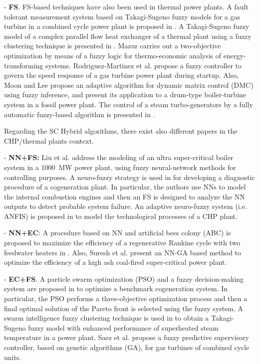 - \textbf{FS}. FS-based techniques have also been used in thermal power plants. A fault tolerant measurement system based on Takagi-Sugeno fuzzy models for a gas turbine in a combined cycle power plant is proposed in \cite{Berrios-2011}. A Takagi-Sugeno fuzzy model of a complex parallel flow heat exchanger of a thermal plant using a fuzzy clustering technique is presented in \cite{Habi-2011}. Mazur \cite{Mazur-2009} carries out a two-objective optimization by means of a fuzzy logic for thermo-economic analysis of energy-transforming systems. Rodriguez-Martinez et al. \cite{Rodriguez-Martinez-2011} propose a fuzzy controller to govern the speed response of a gas turbine power plant during startup. Also, Moon and Lee \cite{Moon-2011} propose an adaptive algorithm for dynamic matrix control (DMC) using fuzzy inference, and present its application to a drum-type boiler-turbine system in a fossil power plant. The control of a steam turbo-generators by a fully automatic fuzzy-based algorithm is presented in \cite{Gunes-2010}.

Regarding the SC Hybrid algorithms, there exist also different papers in the CHP/thermal plants context. 

- \textbf{NN+FS:} Liu et al. \cite{Liu2010} address the modeling of an ultra super-critical boiler system in a \SI{1000}{MW} power plant, using fuzzy neural-network methods for controlling purposes. A neuro-fuzzy strategy is used in \cite{Bare-2005} for developing a diagnostic procedure of a cogeneration plant. In particular, the authors use NNs to model the internal combustion engines and then an FS is designed to analyze the NN outputs to detect probable system failure. An adaptive neuro-fuzzy system (i.e. ANFIS) is proposed in \cite{Mastacan-2005} to model the technological processes of a CHP plant.

- \textbf{NN+EC}: A procedure based on NN and artificial bees colony (ABC) is proposed to maximize the efficiency of a regenerative Rankine cycle with two feedwater heaters in \cite{Rashidi-2011}. Also, Suresh et al. \cite{Suresh-2011} present an NN-GA based method to optimize the efficiency of a high ash coal-fired super-critical power plant.

- \textbf{EC+FS}. A particle swarm optimization (PSO) and a fuzzy decision-making system are proposed in \cite{Sayyaadi-2011} to optimize a benchmark cogeneration system. In particular, the PSO performs a three-objective optimization process and then a final optimal solution of the Pareto front is selected using the fuzzy system. A swarm intelligence fuzzy clustering technique is used in \cite{Su-12} to obtain a Takagi-Sugeno fuzzy model with enhanced performance of  superheated steam temperature in a power plant. Saez et al. \cite{Saez-2007} propose a fuzzy predictive supervisory controller, based on genetic algorithms (GA), for gas turbines of combined cycle units.

